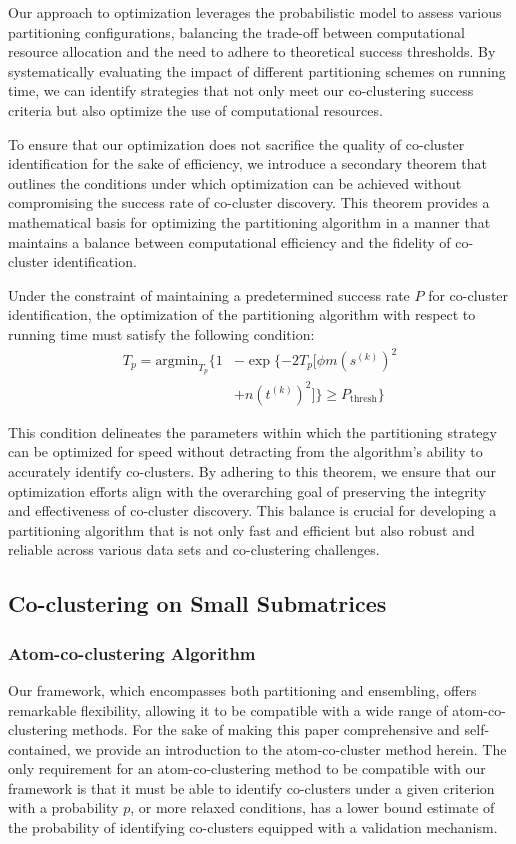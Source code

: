Our approach to optimization leverages the probabilistic model to assess various partitioning configurations, balancing the trade-off between computational resource allocation and the need to adhere to theoretical success thresholds. By systematically evaluating the impact of different partitioning schemes on running time, we can identify strategies that not only meet our co-clustering success criteria but also optimize the use of computational resources.

To ensure that our optimization does not sacrifice the quality of co-cluster identification for the sake of efficiency, we introduce a secondary theorem that outlines the conditions under which optimization can be achieved without compromising the success rate of co-cluster discovery. This theorem provides a mathematical basis for optimizing the partitioning algorithm in a manner that maintains a balance between computational efficiency and the fidelity of co-cluster identification.


Under the constraint of maintaining a predetermined success rate $P$ for co-cluster identification, the optimization of the partitioning algorithm with respect to running time must satisfy the following condition:
\begin{align*}
    T_p = \text{argmin}_{T_p} \{ 
     1 &- \exp \{ -2 T_p [\phi m (s^{(k)})^2 \\
     &+ n (t^{(k)})^2] \} \ge P_{\text{thresh}} \} 
\end{align*}


This condition delineates the parameters within which the partitioning strategy can be optimized for speed without detracting from the algorithm's ability to accurately identify co-clusters. By adhering to this theorem, we ensure that our optimization efforts align with the overarching goal of preserving the integrity and effectiveness of co-cluster discovery. This balance is crucial for developing a partitioning algorithm that is not only fast and efficient but also robust and reliable across various data sets and co-clustering challenges.

\subsection{Co-clustering on Small Submatrices}

\subsubsection{Atom-co-clustering Algorithm}
Our framework, which encompasses both partitioning and ensembling, offers remarkable flexibility, allowing it to be compatible with a wide range of atom-co-clustering methods. For the sake of making this paper comprehensive and self-contained, we provide an introduction to the atom-co-cluster method herein. The only requirement for an atom-co-clustering method to be compatible with our framework is that it must be able to identify co-clusters under a given criterion with a probability $p$, or more relaxed conditions, has a lower bound estimate of the probability of identifying co-clusters equipped with a validation mechanism.

